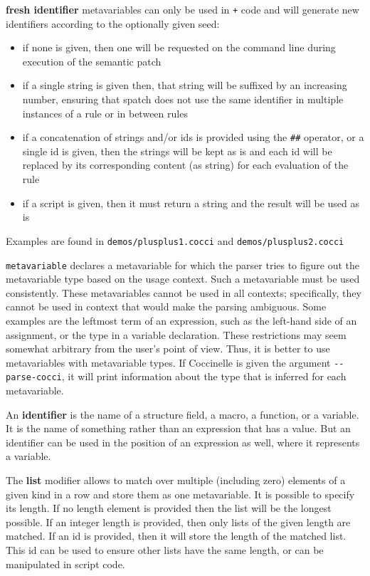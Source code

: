 {\bf fresh identifier} metavariables can only be used in {\tt +} code and will
generate new identifiers according to the optionally given seed:
\begin{itemize}
  \item if none is given, then one will be requested on the command line
    during execution of the semantic patch
  \item if a single string is given then, that string will be suffixed by an
    increasing number, ensuring that spatch does not use the same identifier
    in multiple instances of a rule or in between rules
  \item if a concatenation of strings and/or ids is provided using the
    {\tt \#\#} operator, or a single id is given, then the strings will be kept
    as is and each id will be replaced by its corresponding content (as string)
    for each evaluation of the rule
  \item if a script is given, then it must return a string and the result will be
    used as is
\end{itemize}
Examples are found in {\tt demos/plusplus1.cocci} and
{\tt demos/plusplus2.cocci} %

{\tt metavariable} declares a metavariable for which the parser tries to figure
out the metavariable type based on the usage context. Such a metavariable must
be used consistently. These metavariables cannot be used in all contexts;
specifically, they cannot be used in context that would make the parsing
ambiguous. Some examples are the leftmost term of an expression, such as the
left-hand side of an assignment, or the type in a variable declaration. These
restrictions may seem somewhat arbitrary from the user's point of view. Thus,
it is better to use metavariables with metavariable types. If Coccinelle is
given the argument {\tt -{}-parse-cocci}, it will print information about the
type that is inferred for each metavariable.

An {\bf identifier} is the name of a structure field, a macro, a function,
or a variable.  It is the name of something rather than an expression that
has a value.  But an identifier can be used in the position of an
expression as well, where it represents a variable.

The {\bf list} modifier allows to match over multiple (including zero)
elements of a given kind in a row and store them as one metavariable. It is
possible to specify its length. If no length element is provided then the
list will be the longest possible. If an integer length is provided, then
only lists of the given length are matched. If an id is provided, then it
will store the length of the matched list. This id can be used to ensure
other lists have the same length, or can be manipulated in script code.


